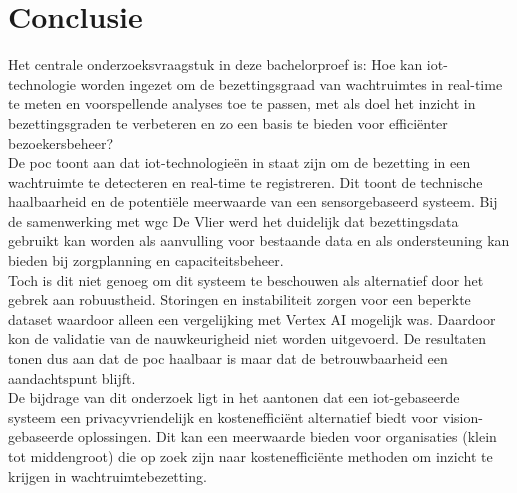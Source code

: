 
\chapter{Conclusie}%
\label{ch:conclusie}


Het centrale onderzoeksvraagstuk in deze bachelorproef is: 
Hoe kan \gls{iot}-technologie worden ingezet om de bezettingsgraad van wachtruimtes in real-time te meten en voorspellende analyses toe te passen, met als doel het inzicht in bezettingsgraden te verbeteren en zo een basis te bieden voor efficiënter bezoekersbeheer? \\

De \gls{poc} toont aan dat \gls{iot}-technologieën in staat zijn om de bezetting in een wachtruimte te detecteren en real-time te registreren. Dit toont de technische haalbaarheid en de potentiële meerwaarde van een sensorgebaseerd systeem.
Bij de samenwerking met \gls{wgc} De Vlier werd het duidelijk dat bezettingsdata gebruikt kan worden als aanvulling voor bestaande data en als ondersteuning kan bieden bij zorgplanning en capaciteitsbeheer. \\

Toch is dit niet genoeg om dit systeem te beschouwen als alternatief door het gebrek aan robuustheid. Storingen en instabiliteit zorgen voor een beperkte dataset waardoor alleen een vergelijking met Vertex AI mogelijk was. Daardoor kon de validatie van de nauwkeurigheid niet worden uitgevoerd. De resultaten tonen dus aan dat de \gls{poc} haalbaar is maar dat de betrouwbaarheid een aandachtspunt blijft. \\

De bijdrage van dit onderzoek ligt in het aantonen dat een \gls{iot}-gebaseerde systeem een privacyvriendelijk en kostenefficiënt alternatief biedt voor vision-gebaseerde oplossingen. Dit kan een meerwaarde bieden voor organisaties (klein tot middengroot) die op zoek zijn naar kostenefficiënte methoden om inzicht te krijgen in wachtruimtebezetting. \\

